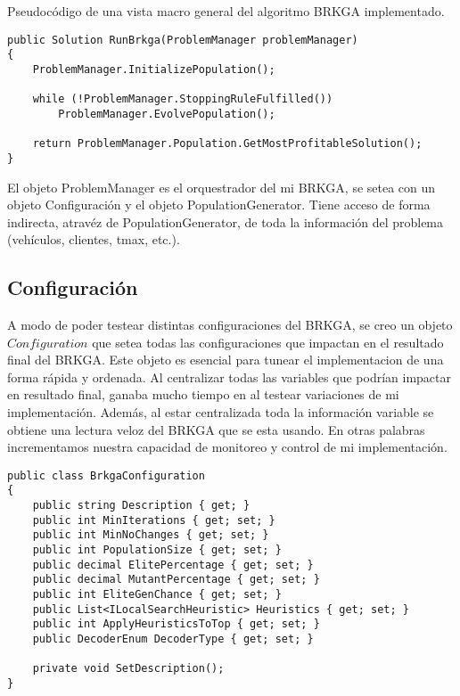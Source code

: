 \bigskip

Pseudocódigo de una vista macro general del algoritmo BRKGA implementado.

\bigskip

\begin{minipage}{\textwidth}
\begin{lstlisting} 
public Solution RunBrkga(ProblemManager problemManager)
{
    ProblemManager.InitializePopulation();

    while (!ProblemManager.StoppingRuleFulfilled())
        ProblemManager.EvolvePopulation();

    return ProblemManager.Population.GetMostProfitableSolution();
}
\end{lstlisting}
\end{minipage}

\bigskip

El objeto ProblemManager es el orquestrador del mi BRKGA, se setea con un objeto Configuración y el objeto PopulationGenerator. Tiene acceso de forma indirecta, atravéz de PopulationGenerator, de toda la información del problema (vehículos, clientes, tmax, etc.).

\subsection{Configuración}

A modo de poder testear distintas configuraciones del BRKGA, se creo un objeto $Configuration$ que setea todas las configuraciones que impactan en el resultado final del BRKGA. Este objeto es esencial para tunear el implementacion de una forma rápida y ordenada. Al centralizar todas las variables que podrían impactar en resultado final, ganaba mucho tiempo en al testear variaciones de mi implementación. Además, al estar centralizada toda la información variable se obtiene una lectura veloz del BRKGA que se esta usando. En otras palabras incrementamos nuestra capacidad de monitoreo y control de mi implementación.

\bigskip

\begin{minipage}{\textwidth}
\begin{lstlisting}
public class BrkgaConfiguration
{
	public string Description { get; }
	public int MinIterations { get; set; }
	public int MinNoChanges { get; set; }
	public int PopulationSize { get; set; }
	public decimal ElitePercentage { get; set; }
	public decimal MutantPercentage { get; set; }
	public int EliteGenChance { get; set; }
	public List<ILocalSearchHeuristic> Heuristics { get; set; }
	public int ApplyHeuristicsToTop { get; set; }
	public DecoderEnum DecoderType { get; set; }
	
	private void SetDescription();
}
\end{lstlisting}
\end{minipage}

